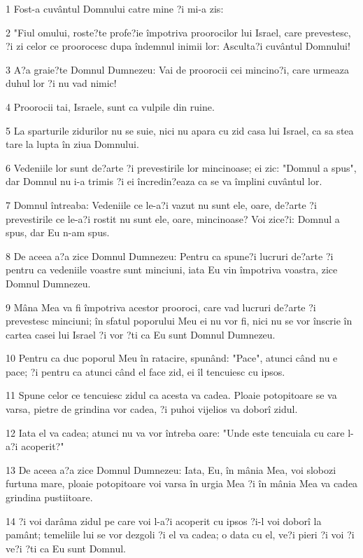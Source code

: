 \par 1 Fost-a cuvântul Domnului catre mine ?i mi-a zis:
\par 2 "Fiul omului, roste?te profe?ie împotriva proorocilor lui Israel, care prevestesc, ?i zi celor ce proorocesc dupa îndemnul inimii lor: Asculta?i cuvântul Domnului!
\par 3 A?a graie?te Domnul Dumnezeu: Vai de proorocii cei mincino?i, care urmeaza duhul lor ?i nu vad nimic!
\par 4 Proorocii tai, Israele, sunt ca vulpile din ruine.
\par 5 La sparturile zidurilor nu se suie, nici nu apara cu zid casa lui Israel, ca sa stea tare la lupta în ziua Domnului.
\par 6 Vedeniile lor sunt de?arte ?i prevestirile lor mincinoase; ei zic: "Domnul a spus", dar Domnul nu i-a trimis ?i ei încredin?eaza ca se va împlini cuvântul lor.
\par 7 Domnul întreaba: Vedeniile ce le-a?i vazut nu sunt ele, oare, de?arte ?i prevestirile ce le-a?i rostit nu sunt ele, oare, mincinoase? Voi zice?i: Domnul a spus, dar Eu n-am spus.
\par 8 De aceea a?a zice Domnul Dumnezeu: Pentru ca spune?i lucruri de?arte ?i pentru ca vedeniile voastre sunt minciuni, iata Eu vin împotriva voastra, zice Domnul Dumnezeu.
\par 9 Mâna Mea va fi împotriva acestor prooroci, care vad lucruri de?arte ?i prevestesc minciuni; în sfatul poporului Meu ei nu vor fi, nici nu se vor înscrie în cartea casei lui Israel ?i vor ?ti ca Eu sunt Domnul Dumnezeu.
\par 10 Pentru ca duc poporul Meu în ratacire, spunând: "Pace", atunci când nu e pace; ?i pentru ca atunci când el face zid, ei îl tencuiesc cu ipsos.
\par 11 Spune celor ce tencuiesc zidul ca acesta va cadea. Ploaie potopitoare se va varsa, pietre de grindina vor cadea, ?i puhoi vijelios va doborî zidul.
\par 12 Iata el va cadea; atunci nu va vor întreba oare: "Unde este tencuiala cu care l-a?i acoperit?"
\par 13 De aceea a?a zice Domnul Dumnezeu: Iata, Eu, în mânia Mea, voi slobozi furtuna mare, ploaie potopitoare voi varsa în urgia Mea ?i în mânia Mea va cadea grindina pustiitoare.
\par 14 ?i voi darâma zidul pe care voi l-a?i acoperit cu ipsos ?i-l voi doborî la pamânt; temeliile lui se vor dezgoli ?i el va cadea; o data cu el, ve?i pieri ?i voi ?i ve?i ?ti ca Eu sunt Domnul.
